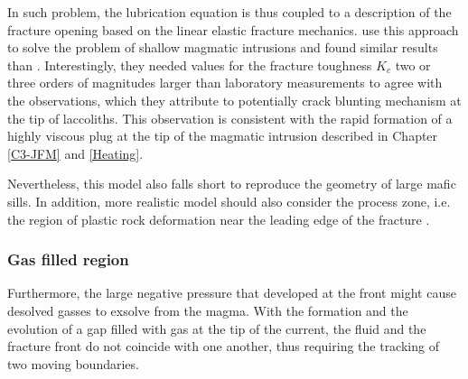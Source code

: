 In  such  problem, the  lubrication  equation  is  thus coupled  to  a
description  of  the fracture  opening  based  on the  linear  elastic
fracture mechanics.  \citet{Bunger:2011cb} use  this approach to solve
the problem of  shallow magmatic intrusions and  found similar results
than  \citet{Michaut:2011kg}.  Interestingly,  they needed  values for
the fracture toughness $K_c$ two  or three orders of magnitudes larger
than  laboratory measurements  to agree  with the  observations, which
they attribute to  potentially crack blunting mechanism at  the tip of
laccoliths.  This  observation is consistent with  the rapid formation
of  a  highly viscous  plug  at  the  tip  of the  magmatic  intrusion
described in Chapter \ref{C3-JFM} and \ref{Heating}.

Nevertheless, this model also falls short to reproduce the geometry of
large  mafic sills.   In addition,  more realistic  model should  also
consider the process zone, i.e. the region of plastic rock deformation
near the leading edge of the fracture \citep{Bunger:2008cl}.

\subsubsection*{Gas filled region}
\label{sec:caref-descr-tip}

Furthermore, the large  negative pressure that developed  at the front
might  cause desolved  gasses to  exsolve  from the  magma.  With  the
formation and the evolution of a gap filled with gas at the tip of the
current, the  fluid and the  fracture front  do not coincide  with one
another, thus requiring the tracking of two moving boundaries.

